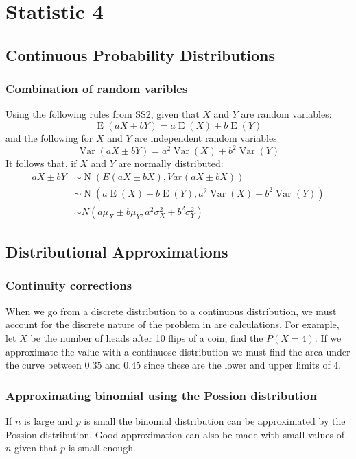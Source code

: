 \chapter*{Statistic 4}

\newpage
\section{Continuous Probability Distributions}

    \newpage
    \subsection{Combination of random varibles}
    Using the following rules from SS2, given that $X$ and $Y$ are random variables:
    $$\operatorname{E}(aX \pm bY) = a\operatorname{E}(X) \pm b\operatorname{E}(Y)$$
    and the following for $X$ and $Y$ are independent random variables
    $$
    \operatorname{Var}(aX \pm bY) = a^2\operatorname{Var}(X) + b^2\operatorname{Var}(Y)
    $$
    It follows that, if $X$ and $Y$ are normally distributed:
    \begin{align*}
    aX \pm bY &\sim \operatorname{N}(E(aX \pm bX), Var(aX \pm bX))\\
    &\sim \operatorname{N}(a\operatorname{E}(X) \pm b\operatorname{E}(Y), a^2\operatorname{Var}(X) + b^2\operatorname{Var}(Y))\\
    &\sim N(a \mu_X \pm b \mu_Y, a^2 \sigma_X^2 + b^2 \sigma_Y^2)
    \end{align*}

\newpage
\section{Distributional Approximations}

    \newpage
    \subsection{Continuity corrections}
        When we go from a discrete distribution to a continuous distribution, we must account for the discrete nature of the problem in are calculations. For example, let $X$ be the number of heads after 10 flips of a coin, find the $P(X = 4)$. If we approximate the value with a continuose distribution we must find the area under the curve between $0.35$ and $0.45$ since these are the lower and upper limits of $4$.

    \newpage
    \subsection{Approximating binomial using the Possion distribution}
        If $n$ is large and $p$ is small the binomial distribution can be approximated by the Possion distribution. Good approximation can also be made with small values of $n$ given that $p$ is small enough.
        
